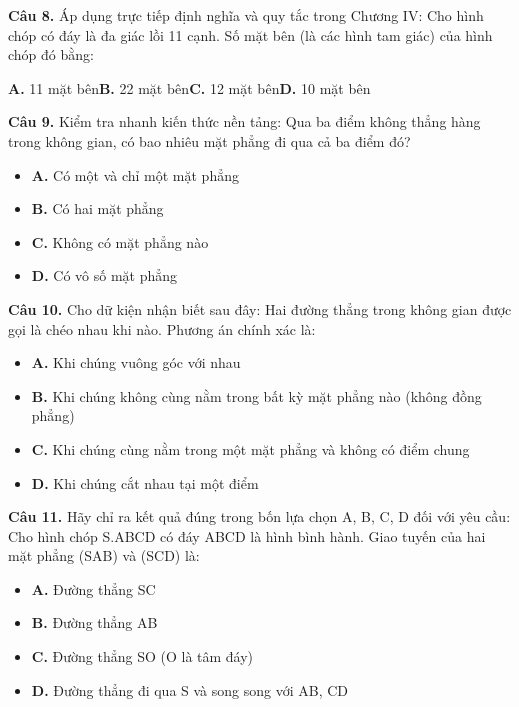 \documentclass[11pt,a4paper]{article}
\begin{document}
\textbf{\color{primary} Câu 8.} Áp dụng trực tiếp định nghĩa và quy tắc trong Chương IV: Cho hình chóp có đáy là đa giác lồi 11 cạnh. Số mặt bên (là các hình tam giác) của hình chóp đó bằng:\par
\hspace*{1.5em}\textbf{A.} 11 mặt bên\quad\quad \textbf{B.} 22 mặt bên\quad\quad \textbf{C.} 12 mặt bên\quad\quad \textbf{D.} 10 mặt bên\par\vspace{2pt}
\textbf{\color{primary} Câu 9.} Kiểm tra nhanh kiến thức nền tảng: Qua ba điểm không thẳng hàng trong không gian, có bao nhiêu mặt phẳng đi qua cả ba điểm đó?\par
\begin{itemize}\setlength{\itemsep}{1pt}\setlength{\parskip}{0pt}
  \item[] \textbf{A.} Có một và chỉ một mặt phẳng
  \item[] \textbf{B.} Có hai mặt phẳng
  \item[] \textbf{C.} Không có mặt phẳng nào
  \item[] \textbf{D.} Có vô số mặt phẳng
\end{itemize}\vspace{2pt}
\textbf{\color{primary} Câu 10.} Cho dữ kiện nhận biết sau đây: Hai đường thẳng trong không gian được gọi là chéo nhau khi nào. Phương án chính xác là:\par
\begin{itemize}\setlength{\itemsep}{1pt}\setlength{\parskip}{0pt}
  \item[] \textbf{A.} Khi chúng vuông góc với nhau
  \item[] \textbf{B.} Khi chúng không cùng nằm trong bất kỳ mặt phẳng nào (không đồng phẳng)
  \item[] \textbf{C.} Khi chúng cùng nằm trong một mặt phẳng và không có điểm chung
  \item[] \textbf{D.} Khi chúng cắt nhau tại một điểm
\end{itemize}\vspace{2pt}
\textbf{\color{primary} Câu 11.} Hãy chỉ ra kết quả đúng trong bốn lựa chọn A, B, C, D đối với yêu cầu: Cho hình chóp S.ABCD có đáy ABCD là hình bình hành. Giao tuyến của hai mặt phẳng (SAB) và (SCD) là:\par
\begin{itemize}\setlength{\itemsep}{1pt}\setlength{\parskip}{0pt}
  \item[] \textbf{A.} Đường thẳng SC
  \item[] \textbf{B.} Đường thẳng AB
  \item[] \textbf{C.} Đường thẳng SO (O là tâm đáy)
  \item[] \textbf{D.} Đường thẳng đi qua S và song song với AB, CD
\end{itemize}\vspace{2pt}
\end{document}
